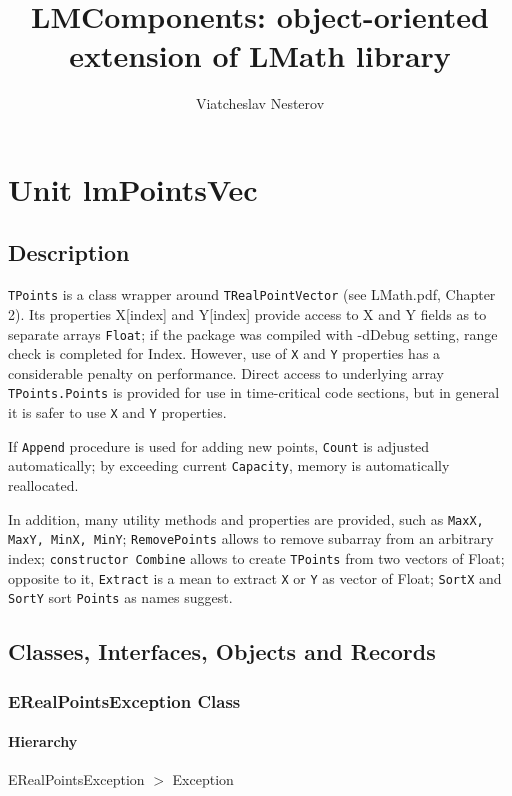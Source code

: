 \documentclass[12pt,a4paper,oneside]{report}
\newcommand{\code}[1]{\texttt{#1}}
\begin{document}
\title{LMComponents: object-oriented extension of LMath library}
\author{Viatcheslav Nesterov}
\maketitle
\newpage
\label{toc}\tableofcontents
\newpage
\newlength{\tmplength}
\chapter{Unit lmPointsVec}
\label{lmPointsVec}
\section{Description}
\code{TPoints} is a class wrapper around \code{TRealPointVector} (see LMath.pdf, Chapter 2). Its properties X[index] and Y[index] provide access to X and Y fields as to separate arrays \code{Float}; if the package was compiled with -dDebug setting, range check is completed for Index. However, use of \code{X} and \code{Y} properties has a considerable penalty on performance. Direct access to underlying array \code{TPoints.Points} is provided for use in time-critical code sections, but in general it is safer to use \code{X} and \code{Y} properties.

If \code{Append} procedure is used for adding new points, \code{Count} is adjusted automatically; by exceeding current \code{Capacity}, memory is automatically reallocated.

In addition, many utility methods and properties are provided, such as \code{MaxX, MaxY, MinX, MinY}; \code{RemovePoints} allows to remove subarray from an arbitrary index; \code{constructor Combine} allows to create \code{TPoints} from two vectors of Float; opposite to it, \code{Extract} is a mean to extract \code{X} or \code{Y} as vector of Float; \code{SortX} and \code{SortY} sort \code{Points} as names suggest.
\section{Classes, Interfaces, Objects and Records}
\subsection{ERealPointsException Class}
\label{lmPointsVec.ERealPointsException}
\subsubsection{Hierarchy}
ERealPointsException {$>$} Exception
\end{document}
